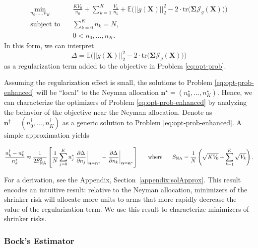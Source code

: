 \documentclass{article}
\newcommand{\bsX}{\boldsymbol X}
\newcommand{\bsSig}{\boldsymbol  \Sigma}
\def\e{\mathbb{E}}
\newcommand{\Tr}{\text{tr}}
\newcommand{\sna}{S_{\text{NA}}}
\begin{document}
\begin{equation}\label{eq:opt-prob-enhanced}
\begin{aligned}
\min_{n_0,\dots,n_K}\quad & \frac{K V_0}{n_0} + \sum_{k=1}^K \frac{V_k}{n_k} + \e \bigg(|| g(\bsX)||_2^2 - 2 \cdot \Tr \big( \bsSig \mathcal{J}_{g}( \bsX )\big)\bigg)\\
\text{subject to}\quad & \sum_{k = 0}^K n_k = N, \\
& 0 < n_0, \dots, n_K. 
\end{aligned}
\end{equation}
In this form, we can interpret 
\[ \Delta = \e \bigg(|| g(\bsX)||_2^2 - 2 \cdot \Tr \big( \bsSig \mathcal{J}_{g}( \bsX )\big)\bigg)\]
as a regularization term added to the objective in Problem \ref{eq:opt-prob}. 

Assuming the regularization effect is small, the solutions to Problem \ref{eq:opt-prob-enhanced} will be ``local" to the Neyman allocation $\boldsymbol{n^\star} = (n_0^\star, \dots, n_K^{\star})$. %
Hence, we can characterize the optimizers of Problem \ref{eq:opt-prob-enhanced} by analyzing the behavior of the objective near the Neyman allocation. Denote as $\boldsymbol{n^\dag} = (n_0^\dag, \dots, n_K^{\dag})$ as a generic solution to Problem \ref{eq:opt-prob-enhanced}. A simple approximation yields 

\begin{equation}\label{eq:solApprox}
\frac{n_k^\dag - n_k^\star}{n_k^\star} \approx \frac{1}{2 \sna^2} \left[ \frac{1}{N} \sum_{j=0}^K n_j^\star \left. \frac{\partial \Delta}{\partial n_j} \right|_{\boldsymbol n = \boldsymbol n^\star} - \left. \frac{\partial \Delta}{\partial n_k} \right|_{\boldsymbol n = \boldsymbol n^\star} \right] \hspace{5mm} \text{ where } \hspace{5mm}\sna = \frac{1}{N} \left( \sqrt{K V_0} + \sum_{k = 1}^K \sqrt{V_k} \right). 
\end{equation}

For a derivation, see the Appendix, Section~\ref{appendix:solApprox}. This result encodes an intuitive result: relative to the Neyman allocation, minimizers of the shrinker risk will allocate more units to arms that more rapidly decrease the value of the regularization term. We use this result to characterize minimizers of shrinker risks. 

\subsubsection{Bock's Estimator}
\end{document}
